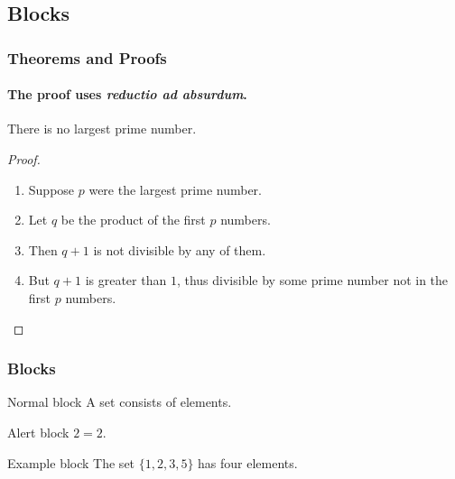\documentclass[11pt]{beamer}
\begin{document}
\subsection{Blocks}

\begin{frame}
\frametitle{Theorems and Proofs}
\framesubtitle{The proof uses \textit{reductio ad absurdum}.}
\begin{theorem}
There is no largest prime number.
\end{theorem}
\begin{proof}
\begin{enumerate}
\item<1-| alert@1> Suppose $p$ were the largest prime number.
\item<2-> Let $q$ be the product of the first $p$ numbers.
\item<3-> Then $q+1$ is not divisible by any of them.
\item<1-> But $q + 1$ is greater than $1$, thus divisible by some prime
number not in the first $p$ numbers.\qedhere
\end{enumerate}
\end{proof}
\end{frame}


\begin{frame}
  \frametitle{Blocks}

  \begin{block}{Normal block}
A \alert{set} consists of elements.
\end{block}

\begin{alertblock}{Alert block}
$2=2$.
\end{alertblock}

\begin{exampleblock}{Example block}
The set $\{1,2,3,5\}$ has four elements.
\end{exampleblock}

\end{frame}
\end{document}
